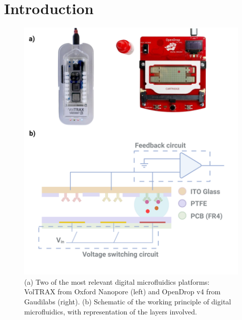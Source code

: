 \documentclass[8pt, twocolumn]{article}
\begin{document}
\clearpage
\twocolumn

\newpage
\section*{Introduction}

\begin{figure}[!b]
  \centering
  \includegraphics[width=\linewidth]{img/1.png}
  \caption{(a) Two of the most relevant digital microfluidics platforms: VolTRAX from Oxford Nanopore (left) and OpenDrop v4 from Gaudilabs (right). (b) Schematic of the working principle of digital microfluidics, with representation of the layers involved.}
  \label{fig:diagram}
\end{figure}
\end{document}
